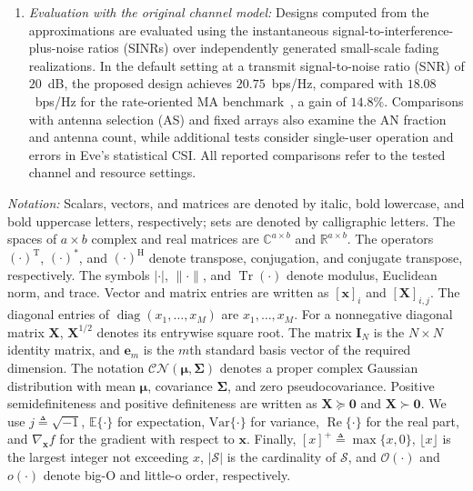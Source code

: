 \documentclass[journal]{IEEEtran}
\newcommand{\E}{\mathbb{E}}
\newcommand{\CN}{\mathcal{CN}}
\newcommand{\tr}{\operatorname{Tr}}
\newcommand{\diag}{\operatorname{diag}}
\newcommand{\RE}{\operatorname{Re}}
\newcommand{\bI}{\mathbf{I}}
\newcommand{\be}{\mathbf{e}}
\newcommand{\bX}{\mathbf{X}}
\newcommand{\bSig}{\boldsymbol{\Sigma}}
\begin{document}
\begin{enumerate}
\item \textit{Evaluation with the original channel model:} Designs computed from the approximations are evaluated using the instantaneous signal-to-interference-plus-noise ratios (SINRs) over independently generated small-scale fading realizations. In the default setting at a transmit signal-to-noise ratio (SNR) of $20$~dB, the proposed design achieves $20.75$~bps/Hz, compared with $18.08$~bps/Hz for the rate-oriented MA benchmark~\cite{ZhengTCOM2025}, a gain of $14.8\%$. Comparisons with antenna selection (AS) and fixed arrays also examine the AN fraction and antenna count, while additional tests consider single-user operation and errors in Eve's statistical CSI. All reported comparisons refer to the tested channel and resource settings.
\end{enumerate}

\textit{Notation:} Scalars, vectors, and matrices are denoted by italic, bold lowercase, and bold uppercase letters, respectively; sets are denoted by calligraphic letters. The spaces of $a\times b$ complex and real matrices are $\mathbb{C}^{a\times b}$ and $\mathbb{R}^{a\times b}$. The operators $(\cdot)^{\mathrm{T}}$, $(\cdot)^{\mathrm{*}}$, and $(\cdot)^{\mathrm{H}}$ denote transpose, conjugation, and conjugate transpose, respectively. The symbols $|\cdot|$, $\|\cdot\|$, and $\tr(\cdot)$ denote modulus, Euclidean norm, and trace. Vector and matrix entries are written as $[\mathbf{x}]_i$ and $[\bX]_{i,j}$. The diagonal entries of $\diag(x_1,\ldots,x_M)$ are $x_1,\ldots,x_M$. For a nonnegative diagonal matrix $\bX$, $\bX^{1/2}$ denotes its entrywise square root. The matrix $\bI_N$ is the $N\times N$ identity matrix, and $\be_m$ is the $m$th standard basis vector of the required dimension. The notation $\CN(\boldsymbol{\mu},\bSig)$ denotes a proper complex Gaussian distribution with mean $\boldsymbol{\mu}$, covariance $\bSig$, and zero pseudocovariance. Positive semidefiniteness and positive definiteness are written as $\bX\succeq\mathbf{0}$ and $\bX\succ\mathbf{0}$. We use $j\triangleq\sqrt{-1}$, $\E\{\cdot\}$ for expectation, $\mathrm{Var}\{\cdot\}$ for variance, $\RE\{\cdot\}$ for the real part, and $\nabla_{\mathbf{x}}f$ for the gradient with respect to $\mathbf{x}$. Finally, $[x]^+\triangleq\max\{x,0\}$, $\lfloor x\rfloor$ is the largest integer not exceeding $x$, $|\mathcal{S}|$ is the cardinality of $\mathcal{S}$, and $\mathcal{O}(\cdot)$ and $o(\cdot)$ denote big-O and little-o order, respectively.

\end{document}
